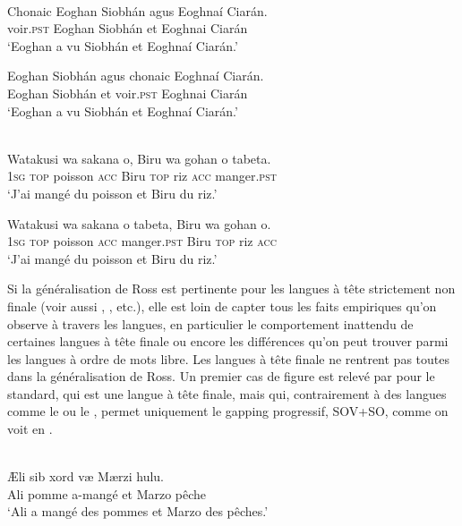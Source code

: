 \ea \label{ch2:ex6}
\\
\ea 
\gll Chonaic Eoghan Siobhán agus Eoghnaí Ciarán.\\
voir.\textsc{pst} Eoghan Siobhán et Eoghnai Ciarán\\
\glt ‘Eoghan a vu Siobhán et Eoghnaí Ciarán.’                     

\ex
\gll *Eoghan Siobhán agus chonaic Eoghnaí Ciarán.\\
Eoghan Siobhán et voir.\textsc{pst} Eoghnai Ciarán\\
\glt ‘Eoghan a vu Siobhán et Eoghnaí Ciarán.’ 
\z
\z

\ea \label{ch2:ex7}
\\
\ea 
\gll Watakusi wa sakana o, Biru wa gohan o tabeta.\\ 
\textsc{1sg} \textsc{top} poisson \textsc{acc} Biru \textsc{top} riz \textsc{acc}   manger.\textsc{pst}\\
\glt ‘J’ai mangé du poisson et Biru du riz.’              

\ex 
\gll *Watakusi wa sakana o tabeta, Biru wa gohan o.\\
\textsc{1sg} \textsc{top} poisson \textsc{acc} manger.\textsc{pst} Biru \textsc{top} riz \textsc{acc}\\
\glt ‘J’ai mangé du poisson et Biru du riz.’   
\z
\z

Si la généralisation de Ross est pertinente pour les langues à tête strictement non finale (voir aussi \citealt{Jackendoff1971}, \citealt{Lobeck1995}, etc.), elle est loin de capter tous les faits empiriques qu’on observe à travers les langues, en particulier le comportement inattendu de certaines langues à tête finale ou encore les différences qu’on peut trouver parmi les langues à ordre de mots libre. Les langues à tête finale ne rentrent pas toutes dans la généralisation de Ross. Un premier cas de figure est relevé par \citet{Hernandez2007} pour le  standard, qui est une langue à tête finale, mais qui, contrairement à des langues comme le  ou le , permet uniquement le gapping progressif, {\cad} SOV+SO, comme on voit en .

\ea \label{ch2:ex8}
\\
\ea 
\gll Æli sib xord væ Mærzi hulu.\\
Ali pomme a-mangé et Marzo pêche\\
\glt ‘Ali a mangé des pommes et Marzo des pêches.’        


